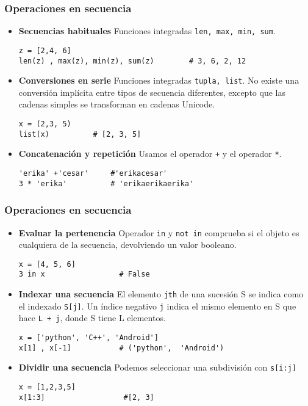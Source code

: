 \documentclass[10pt]{beamer}
\begin{document}
\begin{frame}[fragile]
\frametitle{Operaciones en secuencia}

\begin{itemize}
\item \textbf{Secuencias habituales} Funciones integradas \texttt{len, max, min, sum}.

\begin{lstlisting}
z = [2,4, 6]
len(z) , max(z), min(z), sum(z)        # 3, 6, 2, 12
\end{lstlisting}
\item \textbf{Conversiones en serie} Funciones integradas \texttt{tupla, list}. No existe una conversi\'on impl\'icita entre tipos de secuencia diferentes, excepto que las cadenas simples se transforman en cadenas Unicode. 

\begin{lstlisting}
x = (2,3, 5)
list(x)          # [2, 3, 5]
\end{lstlisting}
\item \textbf{Concatenaci\'on y repetici\'on} Usamos el operador \texttt{+} y el operador \texttt{*}.

\begin{lstlisting}
'erika' +'cesar'     #'erikacesar'
3 * 'erika'          # 'erikaerikaerika'
\end{lstlisting}

\end{itemize}
\end{frame}


\begin{frame}[fragile]

\frametitle{Operaciones en secuencia}
\vspace{0.2cm}

\begin{itemize}
\item \textbf{Evaluar la pertenencia} Operador \texttt{in} y \texttt{not in} comprueba si el objeto es cualquiera de la secuencia, devolviendo un valor booleano.

\begin{lstlisting}
x = [4, 5, 6]
3 in x                 # False
\end{lstlisting}
\item \textbf{Indexar una secuencia} El elemento \texttt{jth} de una sucesi\'on S se indica como el indexado \texttt{S[j]}. Un \'indice negativo \texttt{j} indica el mismo elemento en S que hace \texttt{L + j}, donde S tiene L elementos.

\vspace{0.2cm}

\begin{lstlisting}
x = ['python', 'C++', 'Android']
x[1] , x[-1]           # ('python',  'Android')
\end{lstlisting}
\item \textbf{Dividir una secuencia}  Podemos seleccionar una subdivisi\'on con \texttt{s[i:j]} 

\begin{lstlisting}
x = [1,2,3,5]
x[1:3]                  #[2, 3]
\end{lstlisting} 
\end{itemize}
\end{frame}
\end{document}
